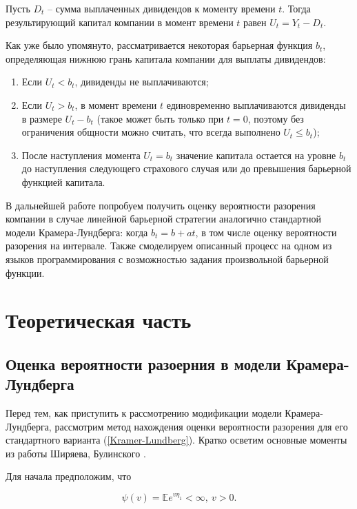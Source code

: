 \documentclass{article}
\theoremstyle{plain}
\theoremstyle{plain}
\theoremstyle{plain}
\theoremstyle{plain}
\theoremstyle{definition}
\theoremstyle{remark}
\begin{document}
Пусть $D_t$ -- сумма выплаченных дивидендов к моменту времени $t$. Тогда результирующий капитал компании в момент времени $t$ равен $U_t = Y_t - D_t$.

Как уже было упомянуто, рассматривается некоторая барьерная функция $b_t$, определяющая нижнюю грань капитала компании для выплаты дивидендов:

\begin{enumerate}
    \item Если $U_t < b_t$, дивиденды не выплачиваются;
    \item Если $U_t > b_t$, в момент времени $t$ единовременно выплачиваются дивиденды в размере $U_t - b_t$ (такое может быть только при $t = 0$, поэтому без ограничения общности можно считать, что всегда выполнено $U_t \leq b_t$);
    \item После наступления момента $U_t = b_t$ значение капитала остается на уровне $b_t$ до наступления следующего страхового случая или до превышения барьерной функцией капитала.
\end{enumerate}

В дальнейшей работе попробуем получить оценку вероятности разорения компании в случае линейной барьерной стратегии аналогично стандартной модели Крамера-Лундберга: когда $b_t = b + at$, в том числе оценку вероятности разорения на интервале. Также смоделируем описанный процесс на одном из языков программирования с возможностью задания произвольной барьерной функции.


\section{Теоретическая часть}

\subsection{Оценка вероятности разоерния в модели Крамера-Лундберга}
\label{KL_Shiryaev_section}

Перед тем, как приступить к рассмотрению модификации модели Крамера-Лундберга, рассмотрим метод нахождения оценки вероятности разорения для его стандартного варианта (\ref{Kramer-Lundberg}). Кратко осветим основные моменты из работы Ширяева, Булинского \cite{Shiryaev_stochastic}.

Для начала предположим, что

\begin{equation}
    \psi(v) = \mathbb{E} e^{v \eta_1} < \infty,\ v > 0.
\end{equation}
\end{document}
